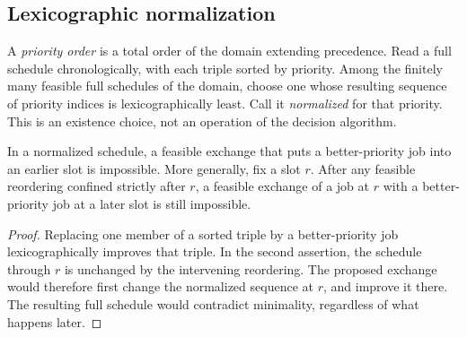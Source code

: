 \subsection{Lexicographic normalization}

A \emph{priority order} is a total order of the domain extending
precedence. Read a full schedule chronologically, with each triple sorted
by priority. Among the finitely many feasible full schedules of the
domain, choose one whose resulting sequence of priority indices is
lexicographically least. Call it \emph{normalized} for that priority.
This is an existence choice, not an operation of the decision algorithm.

\begin{lemma}\label{lem:lex-prefix}
In a normalized schedule, a feasible exchange that puts a better-priority
job into an earlier slot is impossible. More generally, fix a slot \(r\).
After any feasible reordering confined strictly after \(r\), a feasible
exchange of a job at \(r\) with a better-priority job at a later slot
is still impossible.
\end{lemma}
\begin{proof}
Replacing one member of a sorted triple by a better-priority job
lexicographically improves that triple. In the second assertion, the
schedule through \(r\) is unchanged by the intervening reordering.
The proposed exchange would therefore first change the normalized
sequence at \(r\), and improve it there. The resulting full schedule
would contradict minimality, regardless of what happens later.
\end{proof}

